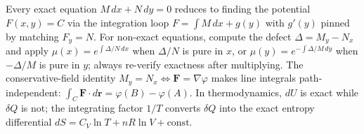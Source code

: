 \vspace{0.8em}

\begin{conceptbox}
Every exact equation $M\,dx+N\,dy=0$ reduces to finding the potential
\textcolor{accentorange}{$F(x,y)=C$} via the integration loop
\textcolor{accentorange}{$F=\int M\,dx+g(y)$} with $g'(y)$ pinned by matching
$F_y=N$. For non-exact equations, compute the defect
\textcolor{accentorange}{$\Delta=M_y-N_x$} and apply
\textcolor{accentorange}{$\mu(x)=e^{\int\Delta/N\,dx}$} when $\Delta/N$ is
pure in $x$, or \textcolor{accentorange}{$\mu(y)=e^{-\int\Delta/M\,dy}$} when
$-\Delta/M$ is pure in $y$; always re-verify exactness after multiplying. The
conservative-field identity \textcolor{accentorange}{$M_y=N_x\iff\mathbf{F}=\nabla\varphi$}
makes line integrals path-independent:
\textcolor{accentorange}{$\int_C\mathbf{F}\cdot d\mathbf{r}=\varphi(B)-\varphi(A)$}.
In thermodynamics, \textcolor{accentorange}{$dU$} is exact while
\textcolor{accentorange}{$\delta Q$} is not; the integrating factor
\textcolor{accentorange}{$1/T$} converts $\delta Q$ into the exact entropy
differential \textcolor{accentorange}{$dS=C_V\ln T+nR\ln V+\text{const}$}.
\end{conceptbox}


